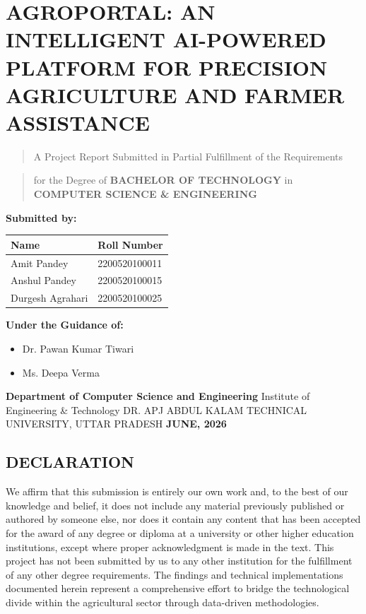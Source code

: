 \documentclass[12pt,a4paper]{report}
\begin{document}
\chapter*{AGROPORTAL: AN INTELLIGENT AI-POWERED PLATFORM FOR PRECISION AGRICULTURE AND FARMER ASSISTANCE}

\begin{quote}
A Project Report Submitted in Partial Fulfillment of the Requirements
\end{quote}
\begin{quote}
for the Degree of \textbf{BACHELOR OF TECHNOLOGY} in \textbf{COMPUTER SCIENCE \& ENGINEERING}
\end{quote}

\newpage

\textbf{Submitted by:}

\begin{table}[h!]
\centering
\begin{tabular}{|l|l|}
\hline
Name & Roll Number \\ \hline
Amit Pandey & 2200520100011 \\ \hline
Anshul Pandey & 2200520100015 \\ \hline
Durgesh Agrahari & 2200520100025 \\ \hline
\end{tabular}
\end{table}

\textbf{Under the Guidance of:}

\begin{itemize}
\item Dr. Pawan Kumar Tiwari
\item Ms. Deepa Verma
\end{itemize}
\textbf{Department of Computer Science and Engineering}
Institute of Engineering \& Technology
DR. APJ ABDUL KALAM TECHNICAL UNIVERSITY, UTTAR PRADESH
\textbf{JUNE, 2026}

\newpage

\section{DECLARATION}

We affirm that this submission is entirely our own work and, to the best of our knowledge and belief, it does not include any material previously published or authored by someone else, nor does it contain any content that has been accepted for the award of any degree or diploma at a university or other higher education institutions, except where proper acknowledgment is made in the text. This project has not been submitted by us to any other institution for the fulfillment of any other degree requirements. The findings and technical implementations documented herein represent a comprehensive effort to bridge the technological divide within the agricultural sector through data-driven methodologies.
\end{document}

